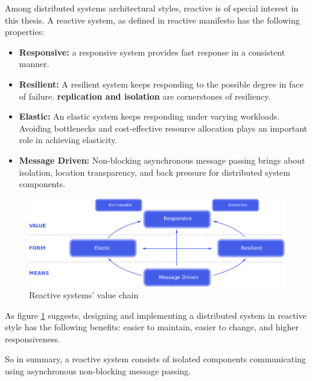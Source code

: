 \documentclass[a4]{report}
\begin{document}
    Among distributed systems architectural styles, reactive is of special interest in this thesis.
    A reactive system, as defined in reactive manifesto \cite{reactive-manifesto} has the following properties:
    \begin{itemize}
        \item \textbf{Responsive:} a responsive system provides fast response in a consistent manner.
        \item \textbf{Resilient:} A resilient system keeps responding to the possible degree in face of failure.
        \textbf{replication and isolation} are cornerstones of resiliency.
        \item \textbf{Elastic:} An elastic system keeps responding under varying workloads.
        Avoiding bottlenecks and cost-effective resource allocation plays an important role in achieving elasticity.
        \item \textbf{Message Driven:} Non-blocking asynchronous message passing brings about isolation, location transparency, and back pressure for distributed system components.
    \end{itemize}

    \begin{figure}[ht]
        \caption{Reactive systems' value chain \cite{reactive-manifesto}}
        \label{fig:reactive-value}
        \includegraphics[width=\linewidth, scale=0.4]{images/reactive-traits.png}
    \end{figure}

    As figure \ref{fig:reactive-value} suggests, designing and implementing a distributed system in reactive style
    has the following benefits: easier to maintain, easier to change, and higher responsiveness.

    So in summary, a reactive system consists of isolated components communicating using asynchronous non-blocking message passing.
\end{document}
